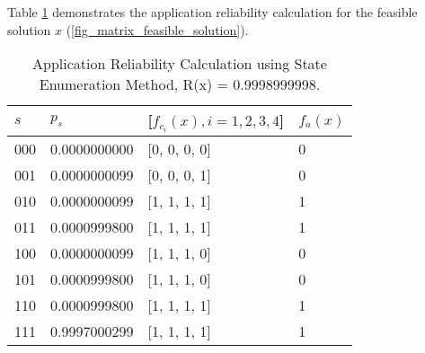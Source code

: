 Table \ref{tbl_application_rel} demonstrates the application reliability calculation for the feasible solution $x$ (\ref{fig_matrix_feasible_solution}). %
\begin{table}[h]
\centering
\begin{tabular}{@{}llll@{}}
\toprule
$s$   & $p_s$     & {[}$f_{c_i}(x), i=1,2,3,4${]} & $f_a(x)$ \\ \midrule
000 & 0.0000000000 & {[}0, 0, 0, 0{]}          & 0     \\
001 & 0.0000000099 & {[}0, 0, 0, 1{]}          & 0     \\
010 & 0.0000000099 & {[}1, 1, 1, 1{]}          & 1     \\
011 & 0.0000999800 & {[}1, 1, 1, 1{]}          & 1     \\
100 & 0.0000000099 & {[}1, 1, 1, 0{]}          & 0     \\
101 & 0.0000999800 & {[}1, 1, 1, 0{]}          & 0     \\
110 & 0.0000999800 & {[}1, 1, 1, 1{]}          & 1     \\
111 & 0.9997000299 & {[}1, 1, 1, 1{]}          & 1     \\ \bottomrule
\end{tabular}
\caption{Application Reliability Calculation using State Enumeration Method, R(x) = 0.9998999998.}
\label{tbl_application_rel}
\end{table}


